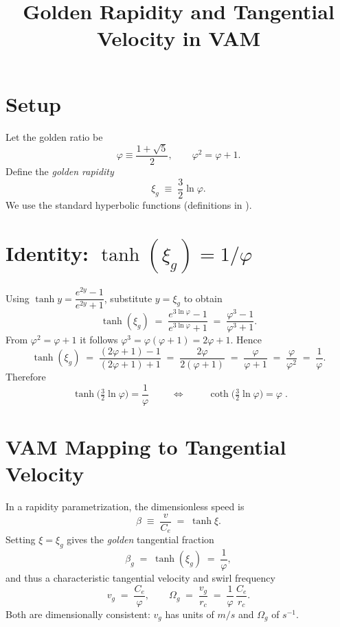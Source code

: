 \documentclass[11pt]{article}
\title{Golden Rapidity and Tangential Velocity in VAM}
\author{}
\date{}
\begin{document}
\maketitle

\section*{Setup}
Let the golden ratio be
\begin{equation}
  \varphi \equiv \frac{1+\sqrt{5}}{2}, \qquad \varphi^2=\varphi+1.
\end{equation}
Define the \emph{golden rapidity}
\begin{equation}
  \xi_g \;\equiv\; \frac{3}{2}\ln\varphi.
\end{equation}
We use the standard hyperbolic functions (definitions in \cite{NISTDLMF}).

\section*{Identity: \(\tanh(\xi_g)=1/\varphi\)}
Using $\tanh y = \dfrac{e^{2y}-1}{e^{2y}+1}$, substitute $y=\xi_g$ to obtain
\begin{equation}
  \tanh(\xi_g) \;=\; \frac{e^{3\ln\varphi}-1}{e^{3\ln\varphi}+1}
  \;=\; \frac{\varphi^3-1}{\varphi^3+1}.
\end{equation}
From $\varphi^2=\varphi+1$ it follows $\varphi^3=\varphi(\varphi+1)=2\varphi+1$. Hence
\begin{equation}
  \tanh(\xi_g) \;=\; \frac{(2\varphi+1)-1}{(2\varphi+1)+1}
  \;=\; \frac{2\varphi}{2(\varphi+1)}
  \;=\; \frac{\varphi}{\varphi+1}
  \;=\; \frac{\varphi}{\varphi^2}
  \;=\; \frac{1}{\varphi}.
\end{equation}
Therefore
\begin{equation}
  \boxed{\;\tanh\!\big(\tfrac{3}{2}\ln\varphi\big)=\frac{1}{\varphi}\;}
  \qquad\Longleftrightarrow\qquad
  \boxed{\;\coth\!\big(\tfrac{3}{2}\ln\varphi\big)=\varphi\; }.
\end{equation}

\section*{VAM Mapping to Tangential Velocity}
In a rapidity parametrization, the dimensionless speed is
\begin{equation}
  \beta \;\equiv\; \frac{v}{C_e} \;=\; \tanh \xi.
\end{equation}
Setting $\xi=\xi_g$ gives the \emph{golden} tangential fraction
\begin{equation}
  \beta_g \;=\; \tanh(\xi_g) \;=\; \frac{1}{\varphi},
\end{equation}
and thus a characteristic tangential velocity and swirl frequency
\begin{equation}
  v_g \;=\; \frac{C_e}{\varphi}, \qquad
  \Omega_g \;=\; \frac{v_g}{r_c} \;=\; \frac{1}{\varphi}\,\frac{C_e}{r_c}.
\end{equation}
Both are dimensionally consistent: $v_g$ has units of \(\si{m/s}\) and $\Omega_g$ of \(\si{s^{-1}}\).
\end{document}
